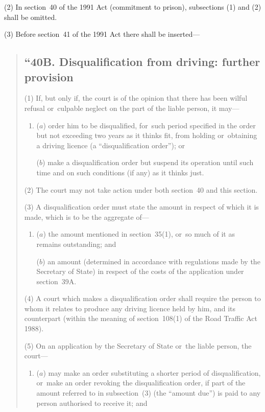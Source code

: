 \documentclass[12pt,a4paper]{article}
\begin{document}
(2) In section~40 of the 1991 Act (commitment to prison), subsections (1)  and (2)  shall be omitted.

(3) Before section~41 of the 1991 Act there shall be inserted—
\begin{quotation}
\subsection*{\sloppy “40B. Disqualification from driving: further provision}
 
(1) If, but only if, the court is of the opinion that there has been wilful refusal or~culpable neglect on the part of the liable person, it may—
\begin{enumerate}\item[]
($a$) order him to be disqualified, for~such period specified in the order but not exceeding two years as it thinks fit, from holding or~obtaining a driving licence (a “disqualification order”); or

($b$) make a disqualification order but suspend its operation until such time and on such conditions (if any) as it thinks just.
\end{enumerate}

(2) The court may not take action under both section~40 and this section.

(3) A disqualification order must state the amount in respect of which it is made, which is to be the aggregate of—
\begin{enumerate}\item[]
($a$) the amount mentioned in section~35(1), or~so much of it as remains outstanding; and

($b$) an amount (determined in accordance with regulations made by the Secretary of State) in respect of the costs of the application under section~39A.
\end{enumerate}

(4) A court which makes a disqualification order shall require the person to whom it relates to produce any driving licence held by him, and its counterpart (within the meaning of section~108(1)  of the Road Traffic Act 1988).

(5) On an application by the Secretary of State or~the liable person, the court—
\begin{enumerate}\item[]
($a$) may make an order substituting a shorter period of disqualification, or~make an order revoking the disqualification order, if part of the amount referred to in subsection~(3)  (the “amount due”) is paid to any person authorised to receive it; and


\end{enumerate}
\end{quotation}
\end{document}
